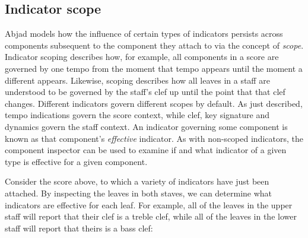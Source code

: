 \subsection{Indicator scope}
\label{ssec:indicator-scope}

Abjad models how the influence of certain types of indicators persists across
components subsequent to the component they attach to via the concept of
\emph{scope}. Indicator scoping describes how, for example, all components in a
score are governed by one tempo from the moment that tempo appears until the
moment a different appears. Likewise, scoping describes how all leaves in a
staff are understood to be governed by the staff's clef up until the point that
that clef changes. Different indicators govern different scopes by default. As
just described, tempo indications govern the score context, while clef, key
signature and dynamics govern the staff context. An indicator governing some
component is known as that component's \emph{effective} indicator. As with
non-scoped indicators, the component inspector can be used to examine if and
what indicator of a given type is effective for a given component.

Consider the score above, to which a variety of indicators have just been
attached. By inspecting the leaves in both staves, we can determine what
indicators are effective for each leaf. For example, all of the leaves in the
upper staff will report that their clef is a treble clef, while all of the
leaves in the lower staff will report that theirs is a bass clef:

\begin{comment}
<abjad>
for leaf in score['Upper Staff'].select_leaves():
    clef = inspect_(leaf).get_effective(Clef)
    print(leaf, clef)

for leaf in score['Lower Staff'].select_leaves():
    clef = inspect_(leaf).get_effective(Clef)
    print(leaf, clef)
</abjad>
\end{comment}

